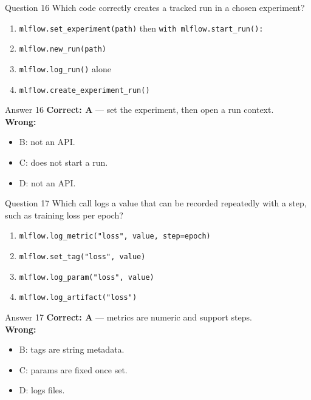 \documentclass[aspectratio=169,11pt]{beamer}
\begin{document}
	\begin{frame}{Question 16}
		Which code correctly creates a tracked run in a chosen experiment?
		\begin{enumerate}[label=\Alph*.]
			\item \texttt{mlflow.set\_experiment(path)} then \texttt{with mlflow.start\_run():}
			\item \texttt{mlflow.new\_run(path)}
			\item \texttt{mlflow.log\_run()} alone
			\item \texttt{mlflow.create\_experiment\_run()}
		\end{enumerate}
	\end{frame}
	\begin{frame}{Answer 16}
		\textbf{Correct: A} --- set the experiment, then open a run context.\\
		\vspace{0.5em}
		\textbf{Wrong:}
		\begin{itemize}
			\item B: not an API.
			\item C: does not start a run.
			\item D: not an API.
		\end{itemize}
	\end{frame}
	
	\begin{frame}{Question 17}
		Which call logs a value that can be recorded repeatedly with a step, such as training loss per epoch?
		\begin{enumerate}[label=\Alph*.]
			\item \texttt{mlflow.log\_metric("loss", value, step=epoch)}
			\item \texttt{mlflow.set\_tag("loss", value)}
			\item \texttt{mlflow.log\_param("loss", value)}
			\item \texttt{mlflow.log\_artifact("loss")}
		\end{enumerate}
	\end{frame}
	\begin{frame}{Answer 17}
		\textbf{Correct: A} --- metrics are numeric and support steps.\\
		\vspace{0.5em}
		\textbf{Wrong:}
		\begin{itemize}
			\item B: tags are string metadata.
			\item C: params are fixed once set.
			\item D: logs files.
		\end{itemize}
	\end{frame}
	
\end{document}
